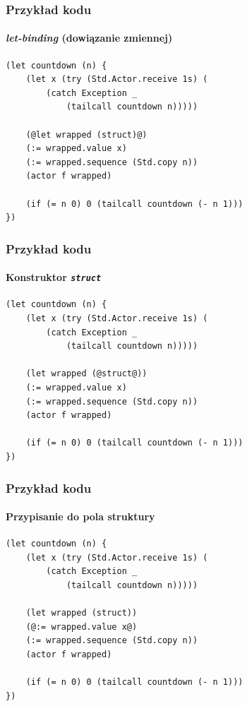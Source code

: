 \documentclass{beamer}
\begin{document}
\begin{frame}[fragile]
    \frametitle{Przykład kodu}
    \framesubtitle{\emph{let-binding} (dowiązanie zmiennej)}

    \begin{small}
    \begin{lstlisting}
(let countdown (n) {
    (let x (try (Std.Actor.receive 1s) (
        (catch Exception _
            (tailcall countdown n)))))

    (@let wrapped (struct)@)
    (:= wrapped.value x)
    (:= wrapped.sequence (Std.copy n))
    (actor f wrapped)

    (if (= n 0) 0 (tailcall countdown (- n 1)))
})
    \end{lstlisting}
    \end{small}
\end{frame}

\begin{frame}[fragile]
    \frametitle{Przykład kodu}
    \framesubtitle{Konstruktor \emph{\texttt{struct}}}

    \begin{small}
    \begin{lstlisting}
(let countdown (n) {
    (let x (try (Std.Actor.receive 1s) (
        (catch Exception _
            (tailcall countdown n)))))

    (let wrapped (@struct@))
    (:= wrapped.value x)
    (:= wrapped.sequence (Std.copy n))
    (actor f wrapped)

    (if (= n 0) 0 (tailcall countdown (- n 1)))
})
    \end{lstlisting}
    \end{small}
\end{frame}

\begin{frame}[fragile]
    \frametitle{Przykład kodu}
    \framesubtitle{Przypisanie do pola struktury}

    \begin{small}
    \begin{lstlisting}
(let countdown (n) {
    (let x (try (Std.Actor.receive 1s) (
        (catch Exception _
            (tailcall countdown n)))))

    (let wrapped (struct))
    (@:= wrapped.value x@)
    (:= wrapped.sequence (Std.copy n))
    (actor f wrapped)

    (if (= n 0) 0 (tailcall countdown (- n 1)))
})
    \end{lstlisting}
    \end{small}
\end{frame}
\end{document}
